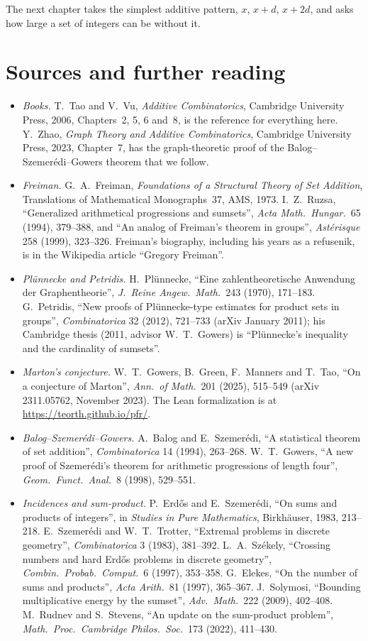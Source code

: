 The next chapter takes the simplest additive pattern, $x$, $x+d$, $x+2d$, and asks how large a set of integers can be without it.

\section*{Sources and further reading}

\begin{itemize}
\item \emph{Books.} T.~Tao and V.~Vu, \emph{Additive Combinatorics}, Cambridge University Press, 2006, Chapters~2, 5, 6 and~8, is the reference for everything here. Y.~Zhao, \emph{Graph Theory and Additive Combinatorics}, Cambridge University Press, 2023, Chapter~7, has the graph-theoretic proof of the Balog--Szemerédi--Gowers theorem that we follow.
\item \emph{Freiman.} G.~A.~Freiman, \emph{Foundations of a Structural Theory of Set Addition}, Translations of Mathematical Monographs~37, AMS, 1973. I.~Z.~Ruzsa, ``Generalized arithmetical progressions and sumsets'', \emph{Acta Math.\ Hungar.}\ 65 (1994), 379--388, and ``An analog of Freiman's theorem in groups'', \emph{Astérisque} 258 (1999), 323--326. Freiman's biography, including his years as a refusenik, is in the Wikipedia article ``Gregory Freiman''.
\item \emph{Plünnecke and Petridis.} H.~Plünnecke, ``Eine zahlentheoretische Anwendung der Graphentheorie'', \emph{J.\ Reine Angew.\ Math.}\ 243 (1970), 171--183. G.~Petridis, ``New proofs of Plünnecke-type estimates for product sets in groups'', \emph{Combinatorica} 32 (2012), 721--733 (arXiv January 2011); his Cambridge thesis (2011, advisor W.~T.~Gowers) is ``Plünnecke's inequality and the cardinality of sumsets''.
\item \emph{Marton's conjecture.} W.~T.~Gowers, B.~Green, F.~Manners and T.~Tao, ``On a conjecture of Marton'', \emph{Ann.\ of Math.}\ 201 (2025), 515--549 (arXiv 2311.05762, November 2023). The Lean formalization is at \url{https://teorth.github.io/pfr/}.
\item \emph{Balog--Szemerédi--Gowers.} A.~Balog and E.~Szemerédi, ``A statistical theorem of set addition'', \emph{Combinatorica} 14 (1994), 263--268. W.~T.~Gowers, ``A new proof of Szemerédi's theorem for arithmetic progressions of length four'', \emph{Geom.\ Funct.\ Anal.}\ 8 (1998), 529--551.
\item \emph{Incidences and sum-product.} P.~Erdős and E.~Szemerédi, ``On sums and products of integers'', in \emph{Studies in Pure Mathematics}, Birkhäuser, 1983, 213--218. E.~Szemerédi and W.~T.~Trotter, ``Extremal problems in discrete geometry'', \emph{Combinatorica} 3 (1983), 381--392. L.~A.~Székely, ``Crossing numbers and hard Erdős problems in discrete geometry'', \emph{Combin.\ Probab.\ Comput.}\ 6 (1997), 353--358. G.~Elekes, ``On the number of sums and products'', \emph{Acta Arith.}\ 81 (1997), 365--367. J.~Solymosi, ``Bounding multiplicative energy by the sumset'', \emph{Adv.\ Math.}\ 222 (2009), 402--408. M.~Rudnev and S.~Stevens, ``An update on the sum-product problem'', \emph{Math.\ Proc.\ Cambridge Philos.\ Soc.}\ 173 (2022), 411--430.

\end{itemize}
